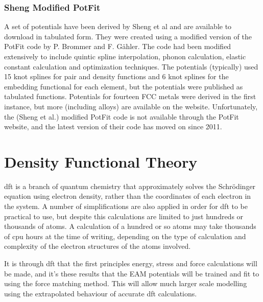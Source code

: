 \subsubsection{Sheng Modified PotFit}
\label{section:shengeampotentials}

A set of potentials have been derived by Sheng et al\cite{shengeam} and are available to download in tabulated form\cite{shengeamonline}.   They were created using a modified version of the PotFit code by P. Brommer and F. G\"ahler\cite{pbrommer}.  The code had been modified extensively to include quintic spline interpolation, phonon calculation, elastic constant calculation and optimization techniques\cite{shengeamonline}.  The potentials (typically) used 15 knot splines for pair and density functions and 6 knot splines for the embedding functional for each element, but the potentials were published as tabulated functions.  Potentials for fourteen FCC metals were derived in the first instance, but more (including alloys) are available on the website.  Unfortunately, the (Sheng et al.) modified PotFit code is not available through the PotFit website\cite{pbrommer}, and the latest version of their code has moved on since 2011.










\section{Density Functional Theory}
\label{section:dftbackground}

\Acrfull{dft} is a branch of quantum chemistry that approximately solves the Schr\"{o}dinger equation using electron density, rather than the coordinates of each electron in the system.  A number of simplifications are also applied in order for \acrshort{dft} to be practical to use, but despite this calculations are limited to just hundreds or thousands of atoms.  A calculation of a hundred or so atoms may take thousands of \acrshort{cpu} hours at the time of writing, depending on the type of calculation and complexity of the electron structures of the atoms involved.

It is through \acrshort{dft} that the first principles energy, stress and force calculations will be made, and it's these results that the EAM potentials will be trained and fit to using the force matching method.  This will allow much larger scale modelling using the extrapolated behaviour of accurate \acrshort{dft} calculations.



